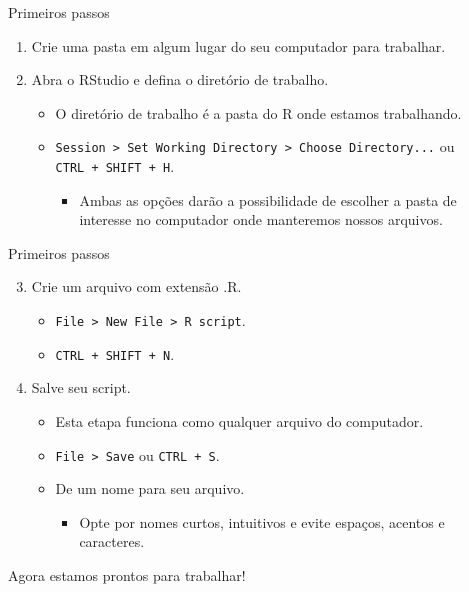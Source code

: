 \documentclass[
  ignorenonframetext,
  serif,
  professionalfont,
  usenames,
  dvipsnames,
  aspectratio = 169]{beamer}
\providecommand{\tightlist}{%
  \setlength{\itemsep}{0pt}\setlength{\parskip}{0pt}}
\renewcommand{\tightlist}{%
  \setlength{\itemsep}{0\baselineskip}
  \setlength{\parskip}{0.25\baselineskip}
}
\begin{document}
\begin{frame}[fragile]{Primeiros passos}
\protect\hypertarget{primeiros-passos}{}
\begin{enumerate}
\item
  Crie uma pasta em algum lugar do seu computador para trabalhar.
\item
  Abra o RStudio e defina o diretório de trabalho.

  \begin{itemize}
  \tightlist
  \item
    O diretório de trabalho é a pasta do R onde estamos trabalhando.
  \item
    \texttt{Session\ \textgreater{}\ Set\ Working\ Directory\ \textgreater{}\ Choose\ Directory...}
    ou \texttt{CTRL\ +\ SHIFT\ +\ H}.

    \begin{itemize}
    \tightlist
    \item
      Ambas as opções darão a possibilidade de escolher a pasta de
      interesse no computador onde manteremos nossos arquivos.
    \end{itemize}
  \end{itemize}
\end{enumerate}
\end{frame}

\begin{frame}[fragile]{Primeiros passos}
\protect\hypertarget{primeiros-passos-1}{}
\begin{enumerate}
\setcounter{enumi}{2}
\tightlist
\item
  Crie um arquivo com extensão .R.

  \begin{itemize}
  \tightlist
  \item
    \texttt{File\ \textgreater{}\ New\ File\ \textgreater{}\ R\ script}.
  \item
    \texttt{CTRL\ +\ SHIFT\ +\ N}.
  \end{itemize}
\item
  Salve seu script.

  \begin{itemize}
  \tightlist
  \item
    Esta etapa funciona como qualquer arquivo do computador.
  \item
    \texttt{File\ \textgreater{}\ Save} ou \texttt{CTRL\ +\ S}.
  \item
    De um nome para seu arquivo.

    \begin{itemize}
    \tightlist
    \item
      Opte por nomes curtos, intuitivos e evite espaços, acentos e
      caracteres.
    \end{itemize}
  \end{itemize}
\end{enumerate}

Agora estamos prontos para trabalhar!
\end{frame}
\end{document}
